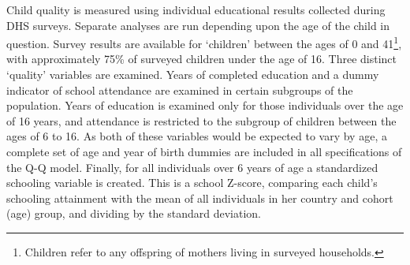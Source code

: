 \documentclass{article}[11pt,subeqn]
\begin{document}
\begin{spacing}{1.5}
\begin{table}[ht]
\begin{center}
\begin{tabular}{lccp{5mm}ccp{5mm}cc}
\end{tabular}
\end{center}
\end{table}

Child quality is measured using individual educational results collected during DHS surveys.  Separate analyses are run depending upon the age 
of the child in question.  Survey results are available for `children' between the ages of 0 and 41\footnote{Children refer to any offspring of 
mothers living in surveyed households.}, with approximately 75\% of surveyed children 
under the age of 16. Three distinct `quality' variables are examined.  Years of completed education and a dummy indicator of school attendance
are examined in certain subgroups of the population.  Years of education is examined only for those individuals over the age of 16 years, and
attendance is restricted to the subgroup of children between the ages of 6 to 16.     As both of these 
variables would be expected to vary by age, a complete set of age and year of birth dummies are included in all specifications of the Q-Q model.  
Finally, for all individuals over 6 years of age a standardized schooling variable is created.  This is a school Z-score, comparing each child's
schooling attainment with the mean of all individuals in her country and cohort (age) group, and dividing by the standard deviation.  


\end{spacing}
\end{document}
